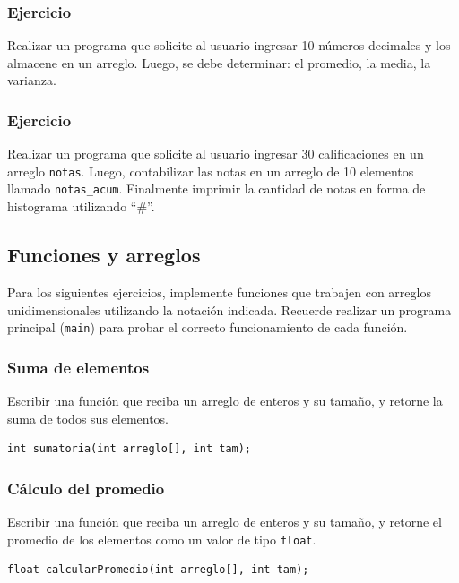 \subsubsection{Ejercicio}
Realizar un programa que solicite al usuario ingresar 10 números decimales y los almacene en un arreglo. Luego, se debe determinar: el promedio, la media, la varianza.

\subsubsection{Ejercicio}
Realizar un programa que solicite al usuario ingresar 30 calificaciones en un arreglo \texttt{notas}. Luego, contabilizar las notas en un arreglo de 10 elementos llamado \texttt{notas\_acum}. Finalmente imprimir la cantidad de notas en forma de histograma utilizando ``\#''.

\subsection*{Funciones y arreglos}

Para los siguientes ejercicios, implemente funciones que trabajen con arreglos unidimensionales utilizando la notación indicada. Recuerde realizar un programa principal (\texttt{main}) para probar el correcto funcionamiento de cada función.

\subsubsection{Suma de elementos}
Escribir una función que reciba un arreglo de enteros y su tamaño, y retorne la suma de todos sus elementos.
\begin{lstlisting}[style=customc, basicstyle=\ttfamily]
int sumatoria(int arreglo[], int tam);
\end{lstlisting}

\subsubsection{Cálculo del promedio}
Escribir una función que reciba un arreglo de enteros y su tamaño, y retorne el promedio de los elementos como un valor de tipo \texttt{float}.
\begin{lstlisting}[style=customc, basicstyle=\ttfamily]
float calcularPromedio(int arreglo[], int tam);
\end{lstlisting}

